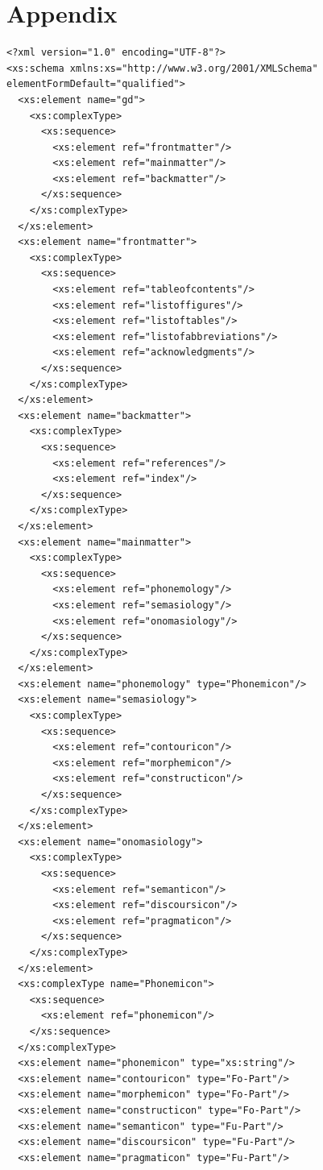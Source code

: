 \documentclass[a4paper,12pt]{article}
\begin{document}



\section{Appendix}
\footnotesize
\begin{verbatim}<?xml version="1.0" encoding="UTF-8"?>
<xs:schema xmlns:xs="http://www.w3.org/2001/XMLSchema" elementFormDefault="qualified">
  <xs:element name="gd">
    <xs:complexType>
      <xs:sequence>
        <xs:element ref="frontmatter"/>
        <xs:element ref="mainmatter"/>
        <xs:element ref="backmatter"/>
      </xs:sequence>
    </xs:complexType>
  </xs:element>
  <xs:element name="frontmatter">
    <xs:complexType>
      <xs:sequence>
        <xs:element ref="tableofcontents"/>
        <xs:element ref="listoffigures"/>
        <xs:element ref="listoftables"/>
        <xs:element ref="listofabbreviations"/>
        <xs:element ref="acknowledgments"/>
      </xs:sequence>
    </xs:complexType>
  </xs:element>
  <xs:element name="backmatter">
    <xs:complexType>
      <xs:sequence>
        <xs:element ref="references"/>
        <xs:element ref="index"/>
      </xs:sequence>
    </xs:complexType>
  </xs:element>
  <xs:element name="mainmatter">
    <xs:complexType>
      <xs:sequence>
        <xs:element ref="phonemology"/>
        <xs:element ref="semasiology"/>
        <xs:element ref="onomasiology"/>
      </xs:sequence>
    </xs:complexType>
  </xs:element>
  <xs:element name="phonemology" type="Phonemicon"/>
  <xs:element name="semasiology">
    <xs:complexType>
      <xs:sequence>
        <xs:element ref="contouricon"/>
        <xs:element ref="morphemicon"/>
        <xs:element ref="constructicon"/>
      </xs:sequence>
    </xs:complexType>
  </xs:element>
  <xs:element name="onomasiology">
    <xs:complexType>
      <xs:sequence>
        <xs:element ref="semanticon"/>
        <xs:element ref="discoursicon"/>
        <xs:element ref="pragmaticon"/>
      </xs:sequence>
    </xs:complexType>
  </xs:element>
  <xs:complexType name="Phonemicon">
    <xs:sequence>
      <xs:element ref="phonemicon"/>
    </xs:sequence>
  </xs:complexType>
  <xs:element name="phonemicon" type="xs:string"/>
  <xs:element name="contouricon" type="Fo-Part"/>
  <xs:element name="morphemicon" type="Fo-Part"/>
  <xs:element name="constructicon" type="Fo-Part"/>
  <xs:element name="semanticon" type="Fu-Part"/>
  <xs:element name="discoursicon" type="Fu-Part"/>
  <xs:element name="pragmaticon" type="Fu-Part"/>

\end{verbatim}
\end{document}

